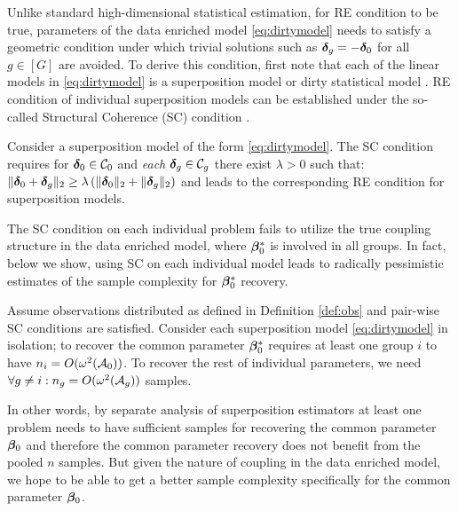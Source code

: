 Unlike standard high-dimensional statistical estimation, for RE condition to be true, parameters of the data enriched model \eqref{eq:dirtymodel} needs to satisfy a geometric condition under which trivial solutions such as $\boldsymbol{\delta}_g=-\boldsymbol{\delta}_0$ for all $g \in [G]$ are avoided.
To derive this condition, first note that each of the linear models in \eqref{eq:dirtymodel} is a superposition model \cite{guba16} or dirty statistical model \cite{yara13}. RE condition of individual superposition models can be established under the so-called Structural Coherence (SC) condition \cite{guba16, mctr13}. 
\begin{definition} \label{scc}
	Consider a superposition model of the form \eqref{eq:dirtymodel}. The SC condition requires for $\ddelta_0 \in \cC_0$ and {\em each} $\ddelta_g \in \cC_g$ there exist $\lambda > 0$ such that: $\|\boldsymbol{\delta}_0 + \boldsymbol{\delta}_g\|_{2} \geq  \lambda \left(\|\boldsymbol{\delta}_0\|_{2} + \|\boldsymbol{\delta}_g\|_{2} \right)$ and leads to the corresponding RE condition for superposition models.
\end{definition}
The SC condition on each individual problem fails to utilize the true coupling structure in the data enriched model, where $\boldsymbol{\beta}^*_0$ is involved in all groups. In fact, below we show, using SC on each individual model leads to radically pessimistic estimates of the sample complexity for $\boldsymbol{\beta}^*_0$ recovery.
\begin{prop}
	\label{prop:super}
	Assume observations distributed as defined in Definition \ref{def:obs} and pair-wise SC conditions are satisfied.  Consider each superposition model \eqref{eq:dirtymodel} in isolation; to recover the common parameter $\boldsymbol{\beta} _0^*$ requires at least one group $i$ to have $n_i = O(\omega^2(\cA_0))$. 
	To recover the rest of individual parameters, we need $\forall g \neq i: n_g = O(\omega^2(\cA_g))$ samples. 
\end{prop}
In other words, by separate analysis of superposition estimators at least one problem needs to have sufficient samples for recovering the common parameter $\boldsymbol{\beta}_0$ and therefore the common parameter recovery does not benefit from the pooled $n$ samples.
But given the nature of coupling in the data enriched model, we hope to be able to get a better sample complexity specifically for the common parameter $\boldsymbol{\beta}_0$.

